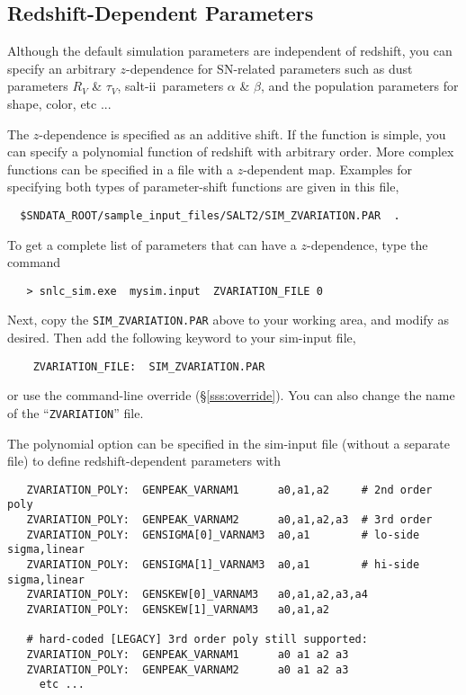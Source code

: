 \documentclass[12pt]{article}
\newcommand{\SALTII}{{\sc salt-ii}}
\begin{document}
   \clearpage
   \subsection{Redshift-Dependent Parameters}
   \label{subsec:zvar}

Although the default simulation parameters are 
independent of redshift, you can specify an arbitrary 
$z$-dependence for SN-related parameters such as
dust parameters $R_V$ \& $\tau_V$, 
\SALTII\ parameters $\alpha$ \& $\beta$, and
the population parameters for shape, color, etc ...

The $z$-dependence is specified as an additive shift.
If the function is simple, you can specify a polynomial
function of redshift with arbitrary order.
More complex functions can be specified in a file with a $z$-dependent map.
Examples for specifying both types of parameter-shift 
functions are given in this file,
%
\begin{verbatim}
  $SNDATA_ROOT/sample_input_files/SALT2/SIM_ZVARIATION.PAR  .
\end{verbatim}
To get a complete list of parameters that can have a
$z$-dependence, type the command
\begin{verbatim}
   > snlc_sim.exe  mysim.input  ZVARIATION_FILE 0 
\end{verbatim}
%
Next, copy the {\tt SIM\_ZVARIATION.PAR} above to your working area,
and modify as desired. Then add the following keyword to 
your sim-input file,
\begin{verbatim}
    ZVARIATION_FILE:  SIM_ZVARIATION.PAR
\end{verbatim}
%
or use the command-line override (\S\ref{sss:override}).
You can also change the name of the ``{\tt ZVARIATION}'' file.

\bigskip
The polynomial option can be specified in the sim-input file
(without a separate file) to define redshift-dependent parameters
with
%
\begin{verbatim}
   ZVARIATION_POLY:  GENPEAK_VARNAM1      a0,a1,a2     # 2nd order poly
   ZVARIATION_POLY:  GENPEAK_VARNAM2      a0,a1,a2,a3  # 3rd order
   ZVARIATION_POLY:  GENSIGMA[0]_VARNAM3  a0,a1        # lo-side sigma,linear
   ZVARIATION_POLY:  GENSIGMA[1]_VARNAM3  a0,a1        # hi-side sigma,linear
   ZVARIATION_POLY:  GENSKEW[0]_VARNAM3   a0,a1,a2,a3,a4
   ZVARIATION_POLY:  GENSKEW[1]_VARNAM3   a0,a1,a2

   # hard-coded [LEGACY] 3rd order poly still supported: 
   ZVARIATION_POLY:  GENPEAK_VARNAM1      a0 a1 a2 a3
   ZVARIATION_POLY:  GENPEAK_VARNAM2      a0 a1 a2 a3
     etc ...
\end{verbatim}
\end{document}
